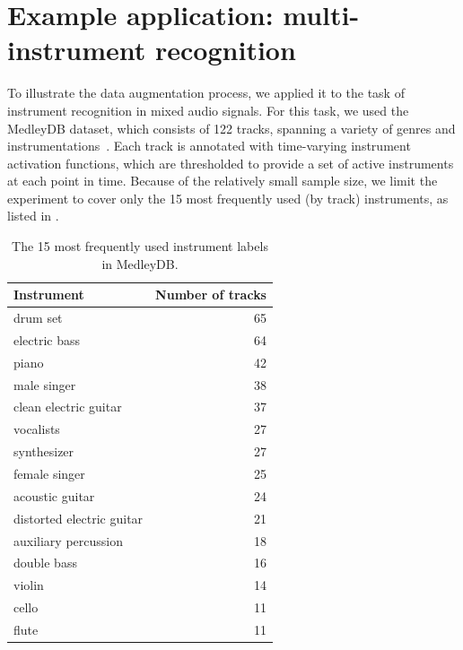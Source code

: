 \documentclass{article}
\begin{document}
\section{Example application: multi-instrument recognition}

To illustrate the data augmentation process, we applied it to the task of instrument
recognition in mixed audio signals.  For this task, we used the MedleyDB dataset, which
consists of 122 tracks, spanning a variety of genres and
instrumentations~\cite{bittner2014medleydb}.  Each track is annotated with time-varying
instrument activation functions, which are thresholded to provide a set of active
instruments at each point in time.
Because of the relatively small sample size, we limit
the experiment to cover only the 15 most frequently used (by track) instruments, as
listed in .

\begin{table}
\caption{The 15 most frequently used instrument labels in MedleyDB.\label{medleytags}}
\centering
\small
    \begin{tabular}{lr}
        \toprule
        Instrument & Number of tracks\\
        \midrule
        drum set                    & 65\\
        electric bass               & 64\\
        piano                       & 42 \\
        male singer                 & 38 \\
        clean electric guitar       & 37\\
        vocalists                   & 27\\
        synthesizer                 & 27\\
        female singer               & 25\\
        acoustic guitar             & 24\\
        distorted electric guitar   & 21\\
        auxiliary percussion        & 18\\
        double bass                 & 16\\
        violin                      & 14\\
        cello                       & 11\\
        flute                       & 11\\
        \bottomrule
    \end{tabular}
\end{table}
\end{document}

